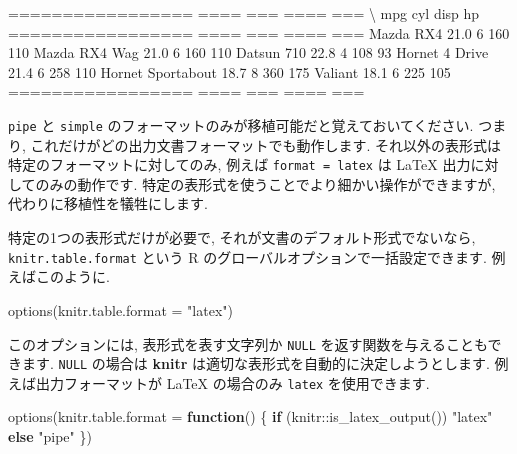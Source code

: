 \documentclass[
  11pt,
  lualatex,ja=standard,jafont=noto]{bxjsreport}
\newenvironment{Shaded}{\begin{snugshade}}{\end{snugshade}}
\newcommand{\AttributeTok}[1]{\textcolor[rgb]{0.77,0.63,0.00}{#1}}
\newcommand{\ControlFlowTok}[1]{\textcolor[rgb]{0.13,0.29,0.53}{\textbf{#1}}}
\newcommand{\FunctionTok}[1]{\textcolor[rgb]{0.00,0.00,0.00}{#1}}
\newcommand{\NormalTok}[1]{#1}
\newcommand{\SpecialCharTok}[1]{\textcolor[rgb]{0.00,0.00,0.00}{#1}}
\newcommand{\StringTok}[1]{\textcolor[rgb]{0.31,0.60,0.02}{#1}}
\begin{document}
\begin{Shaded}
\begin{Highlighting}[]
\NormalTok{=================  ====  ===  ====  ===}
\NormalTok{\textbackslash{}                   mpg  cyl  disp   hp}
\NormalTok{=================  ====  ===  ====  ===}
\NormalTok{Mazda RX4          21.0    6   160  110}
\NormalTok{Mazda RX4 Wag      21.0    6   160  110}
\NormalTok{Datsun 710         22.8    4   108   93}
\NormalTok{Hornet 4 Drive     21.4    6   258  110}
\NormalTok{Hornet Sportabout  18.7    8   360  175}
\NormalTok{Valiant            18.1    6   225  105}
\NormalTok{=================  ====  ===  ====  ===}
\end{Highlighting}
\end{Shaded}

\texttt{pipe} と \texttt{simple} のフォーマットのみが移植可能だと覚えておいてください. つまり, これだけがどの出力文書フォーマットでも動作します. それ以外の表形式は特定のフォーマットに対してのみ, 例えば \texttt{format = \textquotesingle{}latex\textquotesingle{}} は LaTeX 出力に対してのみの動作です. 特定の表形式を使うことでより細かい操作ができますが, 代わりに移植性を犠牲にします.

特定の1つの表形式だけが必要で, それが文書のデフォルト形式でないなら, \texttt{knitr.table.format} という R のグローバルオプションで一括設定できます. 例えばこのように.

\begin{Shaded}
\begin{Highlighting}[numbers=left,,]
\FunctionTok{options}\NormalTok{(}\AttributeTok{knitr.table.format =} \StringTok{"latex"}\NormalTok{)}
\end{Highlighting}
\end{Shaded}

このオプションには, 表形式を表す文字列か \texttt{NULL} を返す関数を与えることもできます. \texttt{NULL} の場合は \textbf{knitr} は適切な表形式を自動的に決定しようとします. 例えば出力フォーマットが LaTeX の場合のみ \texttt{latex} を使用できます.

\begin{Shaded}
\begin{Highlighting}[numbers=left,,]
\FunctionTok{options}\NormalTok{(}\AttributeTok{knitr.table.format =} \ControlFlowTok{function}\NormalTok{() \{}
  \ControlFlowTok{if}\NormalTok{ (knitr}\SpecialCharTok{::}\FunctionTok{is\_latex\_output}\NormalTok{()) }
    \StringTok{"latex"} \ControlFlowTok{else} \StringTok{"pipe"}
\NormalTok{\})}
\end{Highlighting}
\end{Shaded}
\end{document}
